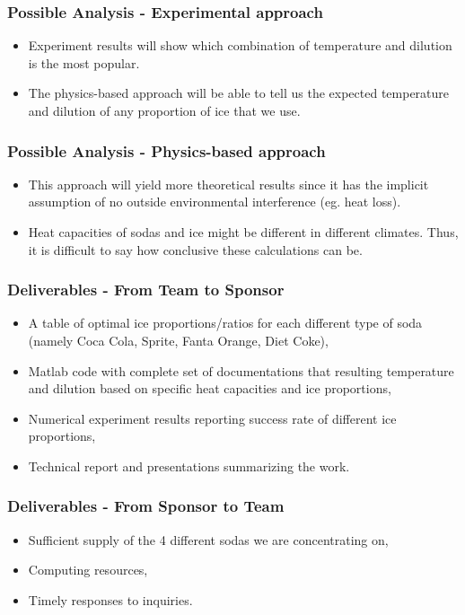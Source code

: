 \documentclass[compress,handout,10pt]{beamer}
\let\olditem\item
\renewcommand{\item}{\setlength{\itemsep}{0.5\baselineskip}\olditem}
\begin{document}
\begin{frame}
    \frametitle{Possible Analysis - Experimental approach}

\begin{itemize}
\item  Experiment results will show which combination of temperature and dilution is the most popular.
\item The physics-based approach will be able to tell us the expected temperature and dilution of any proportion of ice that we use.

\end{itemize}
\end{frame}

\begin{frame}
    \frametitle{Possible Analysis - Physics-based approach}
\begin{itemize}
\item This approach will yield more theoretical results since it has the implicit assumption of no outside environmental interference (eg. heat loss).
\item Heat capacities of sodas and ice might be different in different climates. Thus, it is difficult to say how conclusive these calculations can be.
\end{itemize}
\end{frame}

\begin{frame}
    \frametitle{Deliverables - From Team to Sponsor}
\begin{itemize}
    \item A table of optimal ice proportions/ratios for each different type of soda (namely Coca Cola, Sprite, Fanta Orange, Diet Coke),
    \item Matlab code with complete set of documentations that resulting temperature and dilution based on specific heat capacities and ice proportions,
    \item Numerical experiment results reporting success rate of different ice proportions,
    \item Technical report and presentations summarizing the work. 
\end{itemize}


\end{frame}

\begin{frame}
    \frametitle{Deliverables - From Sponsor to Team}

\begin{itemize}
    \item Sufficient supply of the 4 different sodas we are concentrating on,
    \item Computing resources,
    \item Timely responses to inquiries.
\end{itemize}
\end{frame}
\end{document}
